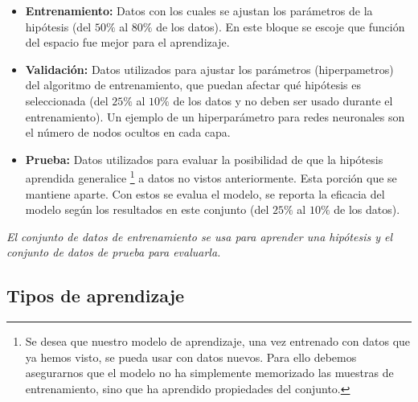 \begin{itemize}
 \item \textbf{Entrenamiento:} Datos con los cuales se ajustan los parámetros de la hipótesis (del \(50\%\) al \(80\%\) de los datos). En este bloque se escoje que función del espacio fue mejor para el aprendizaje.
 
 \item \textbf{Validación:} Datos utilizados para ajustar los parámetros (hiperpametros) del algoritmo de entrenamiento, que puedan afectar qué hipótesis es seleccionada (del \(25\%\) al \(10\%\) de los datos y no deben ser usado durante el entrenamiento). Un ejemplo de un hiperparámetro para redes neuronales son el número de nodos ocultos en cada capa.

 \item \textbf{Prueba:} Datos utilizados para evaluar la posibilidad de que la hipótesis aprendida generalice \footnote{Se desea que nuestro modelo de aprendizaje, una vez entrenado con datos que ya hemos visto, se pueda usar con datos nuevos. Para ello debemos asegurarnos que el modelo no ha simplemente memorizado las muestras de entrenamiento, sino que ha aprendido propiedades del conjunto.} a datos no vistos anteriormente. Esta porción que se mantiene aparte. Con estos se evalua el modelo, se reporta la eficacia del modelo según los resultados en este conjunto (del \(25\%\) al \(10\%\) de los datos).

\end{itemize}

\emph{El conjunto de datos de entrenamiento se usa para aprender una hipótesis y el conjunto de datos de prueba para evaluarla.}

\subsection{Tipos de aprendizaje}

